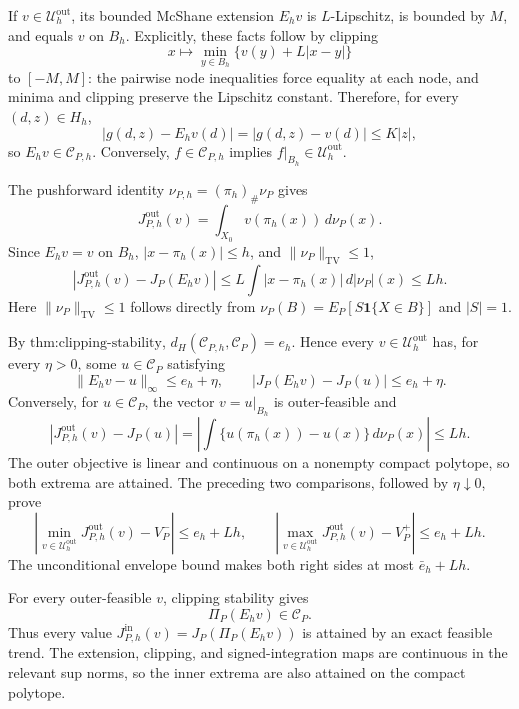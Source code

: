 If \(v\in\mathcal U_h^{\mathrm{out}}\), its bounded McShane extension \(E_hv\) is \(L\)-Lipschitz, is bounded by \(M\), and equals \(v\) on \(B_h\).  Explicitly, these facts follow by clipping
\[
 x\longmapsto\min_{y\in B_h}\{v(y)+L|x-y|\}
\]
to \([-M,M]\): the pairwise node inequalities force equality at each node, and minima and clipping preserve the Lipschitz constant.  Therefore, for every \((d,z)\in H_h\),
\[
 |g(d,z)-E_hv(d)|=|g(d,z)-v(d)|\leq K|z|,
\]
so \(E_hv\in\mathcal C_{P,h}\).  Conversely, \(f\in\mathcal C_{P,h}\) implies \(f|_{B_h}\in\mathcal U_h^{\mathrm{out}}\).

The pushforward identity \(\nu_{P,h}=(\pi_h)_\#\nu_P\) gives
\[
 J_{P,h}^{\mathrm{out}}(v)
 =\int_{X_0}v(\pi_h(x))\,d\nu_P(x).
\]
Since \(E_hv=v\) on \(B_h\), \(|x-\pi_h(x)|\leq h\), and \(\|\nu_P\|_{\mathrm{TV}}\leq1\),
\[
 \left|J_{P,h}^{\mathrm{out}}(v)-J_P(E_hv)\right|
 \leq L\int|x-\pi_h(x)|\,d|\nu_P|(x)
 \leq Lh.
\]
Here \(\|\nu_P\|_{\mathrm{TV}}\leq1\) follows directly from \(\nu_P(B)=E_P[S\mathbf 1\{X\in B\}]\) and \(|S|=1\).

By \(\text{thm:clipping-stability}\), \(d_H(\mathcal C_{P,h},\mathcal C_P)=e_h\).  Hence every \(v\in\mathcal U_h^{\mathrm{out}}\) has, for every \(\eta>0\), some \(u\in\mathcal C_P\) satisfying
\[
 \|E_hv-u\|_\infty\leq e_h+\eta,
 \qquad
 |J_P(E_hv)-J_P(u)|\leq e_h+\eta.
\]
Conversely, for \(u\in\mathcal C_P\), the vector \(v=u|_{B_h}\) is outer-feasible and
\[
 |J_{P,h}^{\mathrm{out}}(v)-J_P(u)|
 =\left|\int\{u(\pi_h(x))-u(x)\}\,d\nu_P(x)\right|
 \leq Lh.
\]
The outer objective is linear and continuous on a nonempty compact polytope, so both extrema are attained.  The preceding two comparisons, followed by \(\eta\downarrow0\), prove
\[
 \left|\min_{v\in\mathcal U_h^{\mathrm{out}}}J_{P,h}^{\mathrm{out}}(v)-V_P^-\right|
 \leq e_h+Lh,
 \qquad
 \left|\max_{v\in\mathcal U_h^{\mathrm{out}}}J_{P,h}^{\mathrm{out}}(v)-V_P^+\right|
 \leq e_h+Lh.
\]
The unconditional envelope bound makes both right sides at most \(\bar e_h+Lh\).

For every outer-feasible \(v\), clipping stability gives
\[
 \Pi_P(E_hv)\in\mathcal C_P.
\]
Thus every value \(J_{P,h}^{\mathrm{in}}(v)=J_P(\Pi_P(E_hv))\) is attained by an exact feasible trend.  The extension, clipping, and signed-integration maps are continuous in the relevant sup norms, so the inner extrema are also attained on the compact polytope.


